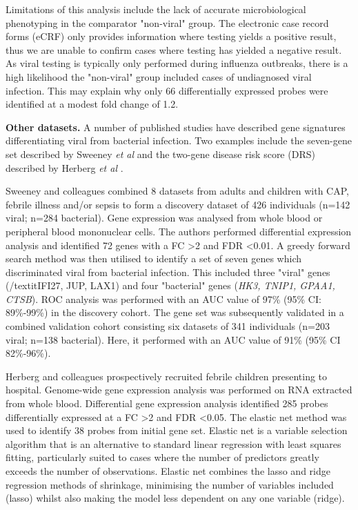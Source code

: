 Limitations of this analysis include the lack of accurate microbiological phenotyping in the comparator "non-viral" group. The electronic case record forms (eCRF) only provides information where testing yields a positive result, thus we are unable to confirm cases where testing has yielded a negative result. As viral testing is typically only performed during influenza outbreaks, there is a high likelihood the "non-viral" group included cases of undiagnosed viral infection. This may explain why only 66 differentially expressed probes were identified at a modest fold change of 1.2. 

\textbf{Other datasets.} A number of published studies have described gene signatures differentiating viral from bacterial infection. Two examples include the seven-gene set described by Sweeney \textit{et al} \parencite{Sweeney2016} and the two-gene disease risk score (DRS) described by Herberg \textit{et al} \parencite{Herberg2016}.

Sweeney and colleagues \parencite{Sweeney2016} combined 8 datasets from adults and children with CAP, febrile illness and/or sepsis to form a discovery dataset of 426 individuals (n=142 viral; n=284 bacterial). Gene expression was analysed from whole blood or peripheral blood mononuclear cells. The authors performed differential expression analysis and identified 72 genes with a FC >2 and FDR <0.01. A greedy forward search method was then utilised to identify a set of seven genes which discriminated viral from bacterial infection. This included three "viral" genes (/textit{IFI27, JUP, LAX1}) and four "bacterial" genes (\textit{HK3, TNIP1, GPAA1, CTSB}). ROC analysis was performed with an AUC value of 97\% (95\% CI: 89\%-99\%) in the discovery cohort. The gene set was subsequently validated in a combined validation cohort consisting six datasets of 341 individuals (n=203 viral; n=138 bacterial). Here, it performed with an AUC value of 91\% (95\% CI 82\%-96\%). 

Herberg and colleagues \parencite{Herberg2016} prospectively recruited febrile children presenting to hospital. Genome-wide gene expression analysis was performed on RNA extracted from whole blood. Differential gene expression analysis identified 285 probes differentially expressed at a FC >2 and FDR <0.05. The elastic net method \parencite{Zou2005} was used to identify 38 probes from initial gene set. Elastic net is a variable selection algorithm that is an alternative to standard linear regression with least squares fitting, particularly suited to cases where the number of predictors greatly exceeds the number of observations. Elastic net combines the lasso and ridge regression methods of shrinkage, minimising the number of variables included (lasso) whilst also making the model less dependent on any one variable (ridge).

